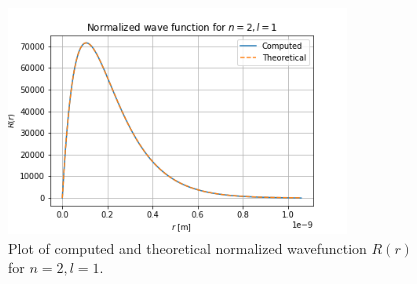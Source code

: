\documentclass{article}
\begin{document}
\begin{figure}[H]
	\centering
	\includegraphics[width=0.8\textwidth]{../images/q2_d_n=2_l=1.png}
	\caption{Plot of computed and theoretical normalized wavefunction $R(r)$ for $n=2, l=1$.}
	\label{fig:q2_d_n=2_l=1}
\end{figure}
\end{document}
